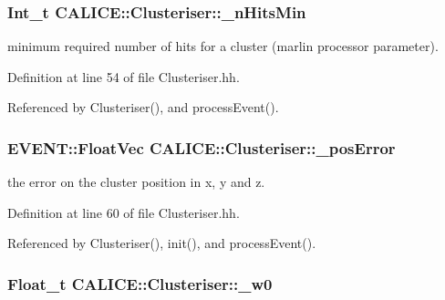\subsubsection[{\-\_\-n\-Hits\-Min}]{\setlength{\rightskip}{0pt plus 5cm}Int\-\_\-t C\-A\-L\-I\-C\-E\-::\-Clusteriser\-::\-\_\-n\-Hits\-Min\hspace{0.3cm}{\ttfamily [protected]}}\label{classCALICE_1_1Clusteriser_a5451dad61f977c6de41a25739c6fb97c}


minimum required number of hits for a cluster (marlin processor parameter). 



Definition at line 54 of file Clusteriser.\-hh.



Referenced by Clusteriser(), and process\-Event().

\subsubsection[{\-\_\-pos\-Error}]{\setlength{\rightskip}{0pt plus 5cm}E\-V\-E\-N\-T\-::\-Float\-Vec C\-A\-L\-I\-C\-E\-::\-Clusteriser\-::\-\_\-pos\-Error\hspace{0.3cm}{\ttfamily [protected]}}\label{classCALICE_1_1Clusteriser_a02ac68c99c5bc9a3bb259cde379316d5}


the error on the cluster position in x, y and z. 



Definition at line 60 of file Clusteriser.\-hh.



Referenced by Clusteriser(), init(), and process\-Event().

\subsubsection[{\-\_\-w0}]{\setlength{\rightskip}{0pt plus 5cm}Float\-\_\-t C\-A\-L\-I\-C\-E\-::\-Clusteriser\-::\-\_\-w0\hspace{0.3cm}{\ttfamily [protected]}}\label{classCALICE_1_1Clusteriser_aa761e8e58c6b8b4239ebccf1cf7e0f44}


